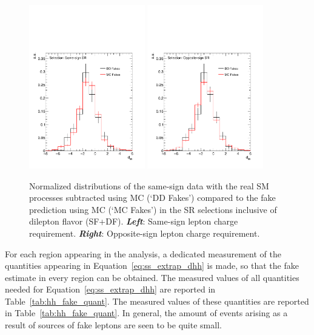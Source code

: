\begin{figure}[!htb]
    \begin{center}
    \includegraphics[width=0.45\textwidth]{figures/search_hh/bkg_estimate/fake/fake_shape_NN_d_hh_sr_ss_out}
    \includegraphics[width=0.45\textwidth]{figures/search_hh/bkg_estimate/fake/fake_shape_NN_d_hh_sr_os_out}
    \caption{
        Normalized \dhh distributions of the same-sign data with the real SM processes subtracted using MC (`DD Fakes') compared
            to the fake prediction using MC (`MC Fakes') in the SR selections inclusive of dilepton flavor (SF+DF).
            \textit{\textbf{Left}}: Same-sign lepton charge requirement.
            \textit{\textbf{Right}}: Opposite-sign lepton charge requirement.
    }
    \label{fig:fake_val_ss_os_shape}
    \end{center}
\end{figure}

For each region appearing in the analysis, a dedicated measurement of the quantities appearing in Equation~\ref{eq:ss_extrap_dhh}
is made, so that the fake estimate in every region can be obtained.
The measured values of all quantities needed for Equation~\ref{eq:ss_extrap_dhh} are reported in Table~\ref{tab:hh_fake_quant}.
The measured values of these quantities are reported in Table~\ref{tab:hh_fake_quant}.
In general, the amount of events arising as a result of sources of fake leptons are seen to be
quite small.

